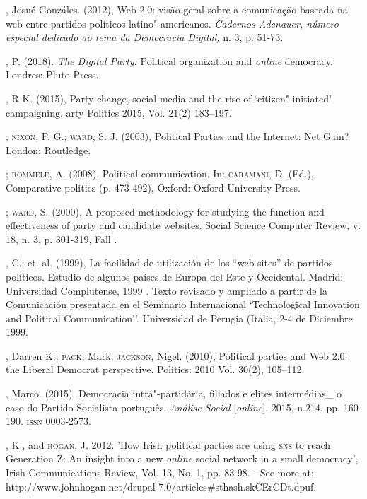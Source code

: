 \begin{bibliohedra}
, Josué Gonzáles. (2012), Web 2.0: visão geral sobre a
comunicação baseada na web entre partidos políticos latino"-americanos.
\emph{Cadernos Adenauer, número especial dedicado ao tema da Democracia
Digital,} n. 3, p. 51-73.

, P. (2018). \emph{The Digital Party:} Political organization
and \emph{\emph{online}} democracy. Londres: Pluto Press.

, R K. (2015), Party change, social media and the rise of
`citizen"-initiated' campaigning. arty Politics 2015, Vol. 21(2)
183--197.

\titidem; \textsc{nixon}, P. G.; \textsc{ward}, S. J. (2003), Political Parties and the Internet: Net Gain? London: Routledge.

\titidem; \textsc{rommele}, A. (2008), Political communication. In:
\textsc{caramani}, D. (Ed.), Comparative politics (p. 473-492), Oxford: Oxford
University Press.

\titidem; \textsc{ward}, S. (2000), A proposed methodology for studying the
function and effectiveness of party and candidate websites. Social
Science Computer Review, v. 18, n. 3, p. 301-319, Fall .

, C.; et. al. (1999), La facilidad de utilización de los ``web
sites'' de partidos políticos. Estudio de algunos países de Europa del
Este y Occidental. Madrid: Universidad Complutense, 1999 . Texto
revisado y ampliado a partir de la Comunicación presentada en el
Seminario Internacional `Technological Innovation and Political
Communication''. Universidad de Perugia (Italia, 2-4 de Diciembre 1999.

, Darren K.; \textsc{pack}, Mark; \textsc{jackson}, Nigel. (2010), Political
parties and Web 2.0: the Liberal Democrat perspective. Politics: 2010
Vol. 30(2), 105--112.

, Marco. (2015). Democracia intra"-partidária, filiados e elites
intermédias\_ o caso do Partido Socialista português. \emph{Análise
Social} {[}\emph{\emph{online}}{]}. 2015, n.214, pp. 160-190. \textsc{issn} 0003-2573.

, K., and \textsc{hogan}, J. 2012. 'How Irish political parties are using
\textsc{sns} to reach Generation Z: An insight into a new \emph{\emph{online}} social network
in a small democracy', Irish Communications Review, Vol. 13, No. 1, pp.
83-98. - See more at:
http://www.johnhogan.net/drupal-7.0/articles\#sthash.skCErCDt.dpuf. %


\end{bibliohedra}
